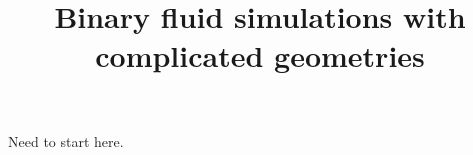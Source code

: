 \documentclass{article}
\title{Binary fluid simulations with complicated geometries}
\begin{document}
\maketitle
Need to start here.
\end{document}
